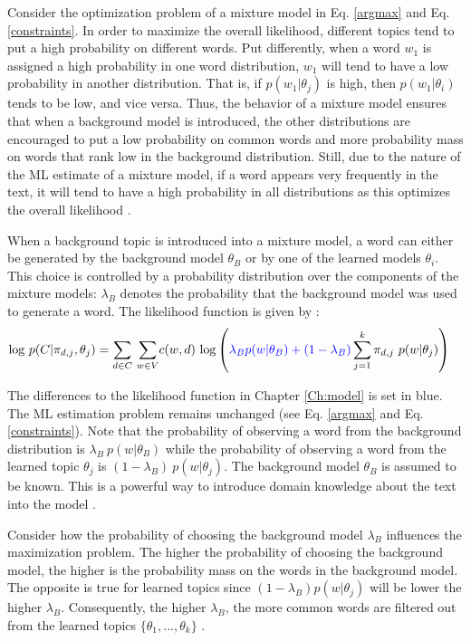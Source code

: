 \documentclass[11pt,a4paper,english,oneside]{book}
\numberwithin{equation}{chapter}
\begin{document}
Consider the optimization problem of a mixture model in Eq. \ref{argmax} and Eq. \ref{constraints}. In order to maximize the overall likelihood, different topics tend to put a high probability on different words. Put differently, when a word $w_1$ is assigned a high probability in one word distribution, $w_1$ will tend to have a low probability in another distribution. That is, if $p(w_1|\theta_j)$ is high, then $p(w_1|\theta_i)$ tends to be low, and vice versa. Thus, the behavior of a mixture model ensures that when a background model is introduced, the other distributions are encouraged to put a low probability on common words and more probability mass on words that rank low in the background distribution. Still, due to the nature of the ML estimate of a mixture model, if a word appears very frequently in the text, it will tend to have a high probability in all distributions as this optimizes the overall likelihood \citep[pp. 353--359]{Zhai.2016}.

When a background topic is introduced into a mixture model, a word can either be generated by the background model $\theta_B$ or by one of the learned models $\theta_i$. This choice is controlled by a probability distribution over the components of the mixture models: $\lambda_B$ denotes the probability that the background model was used to generate a word. The likelihood function is given by \citep[p. 372]{Zhai.2016}:
\begin{align}
\label{BLL} \text{log} \ p(C|\pi_{d,j},\theta_j) &= \underset{d \in C}{\sum} \ \underset{w \in V}\sum c(w,d) \ \text{log} \left( \textcolor{blue}{\lambda_B p(w|\theta_B) + (1-\lambda_B)} \sum_{j=1}^{k}\pi_{d,j} \ p(w|\theta_j) \right)
\end{align}

The differences to the likelihood function in Chapter \ref{Ch:model} is set in blue. The ML estimation problem remains unchanged (see Eq. \ref{argmax} and Eq. \ref{constraints}). Note that the probability of observing a word from the background distribution is $\lambda_B \ p(w|\theta_B)$ while the probability of observing a word from the learned topic $\theta_j$ is $(1-\lambda_B) \ p(w|\theta_j)$. The background model $\theta_B$ is assumed to be known. %
This is a powerful way to introduce domain knowledge about the text into the model \citep[pp. 352, 372--376]{Zhai.2016}. 

Consider how the probability of choosing the background model $\lambda_B$ influences the maximization problem. The higher the probability of choosing the background model, the higher is the probability mass on the words in the background model.  The opposite is true for learned topics since $(1-\lambda_B)  p(w|\theta_j)$ will be lower the higher $\lambda_B$. %
Consequently, the higher $\lambda_B$, the more common words are filtered out from the learned topics $\{\theta_1, ..., \theta_k\}$ \citep[pp. 352--359]{Zhai.2016}.  
\end{document}
